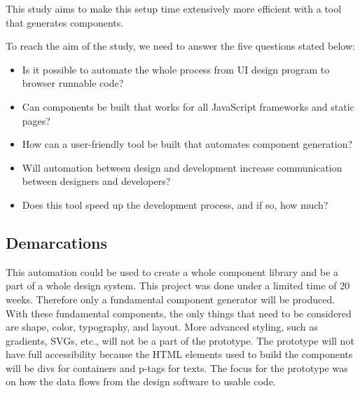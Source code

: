This study aims to make this setup time extensively more efficient with a tool that generates components. 

To reach the aim of the study, we need to answer the five questions stated below:  

\begin{itemize}
  \item Is it possible to automate the whole process from UI design program to browser runnable code? 
  \item Can components be built that works for all JavaScript frameworks and static pages? 
  \item How can a user-friendly tool be built that automates component generation? 
  \item Will automation between design and development increase communication between designers and developers? 
  \item Does this tool speed up the development process, and if so, how much?
\end{itemize}

\subsection{Demarcations}%
\label{sub:Demarcations}
This automation could be used to create a whole component library and be a part of a whole design system. This project was done under a limited time of 20 weeks. Therefore only a fundamental component generator will be produced. With these fundamental components, the only things that need to be considered are shape, color, typography, and layout. More advanced styling, such as gradients, SVGs, etc., will not be a part of the prototype. The prototype will not have full accessibility because the HTML elements used to build the components will be divs for containers and p-tags for texts. The focus for the prototype was on how the data flows from the design software to usable code.



